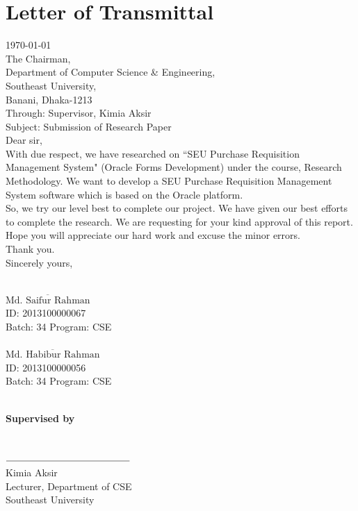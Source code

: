 \documentclass[12pt]{report} %
\begin{document}

\section*{Letter of Transmittal}
\thispagestyle{empty}
\today\\
The Chairman,\\
Department of Computer Science \& Engineering,\\
Southeast University,\\
Banani, Dhaka-1213\\

Through: Supervisor, Kimia Aksir\\
Subject: Submission of Research Paper\\
Dear sir,\\
With due respect, we have researched on ``SEU Purchase Requisition Management System" (Oracle Forms Development) under the course, Research Methodology. We want to develop a SEU Purchase Requisition Management System software which is based on the Oracle platform.\\
So, we try our level best to complete our project. We have given our best efforts to complete the research. We are requesting for your kind approval of this report. Hope you will appreciate our hard work and excuse the minor errors.\\
Thank you.\\
Sincerely yours,\\~\\

\begin{minipage}[t]{0.5\textwidth}
$\overline
{\text{Md. Saifur Rahman}}$\\
ID: 2013100000067\\
Batch: 34  Program: CSE\\
\\
$\overline
{\text{Md. Habibur Rahman}}$\\
ID: 2013100000056\\
Batch: 34  Program: CSE\\
\\


\end{minipage}
\begin{minipage}[t]{0.5\textwidth}


\begin{center}
\textbf{Supervised by} \\~\\~\\
	$\overline{\text{}\mkern 230mu}$\\
Kimia Aksir\\
Lecturer, Department of CSE\\
Southeast University
\end{center}


\end{minipage}
\end{document}

